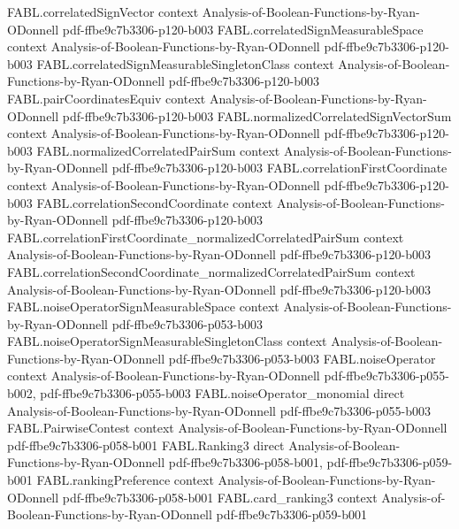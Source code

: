 \begin{theorem}
\proofstep
  {FABL.correlatedSignVector}
  {context}
  {Analysis-of-Boolean-Functions-by-Ryan-ODonnell}
  {pdf-ffbe9c7b3306-p120-b003}
\proofstep
  {FABL.correlatedSignMeasurableSpace}
  {context}
  {Analysis-of-Boolean-Functions-by-Ryan-ODonnell}
  {pdf-ffbe9c7b3306-p120-b003}
\proofstep
  {FABL.correlatedSignMeasurableSingletonClass}
  {context}
  {Analysis-of-Boolean-Functions-by-Ryan-ODonnell}
  {pdf-ffbe9c7b3306-p120-b003}
\proofstep
  {FABL.pairCoordinatesEquiv}
  {context}
  {Analysis-of-Boolean-Functions-by-Ryan-ODonnell}
  {pdf-ffbe9c7b3306-p120-b003}
\proofstep
  {FABL.normalizedCorrelatedSignVectorSum}
  {context}
  {Analysis-of-Boolean-Functions-by-Ryan-ODonnell}
  {pdf-ffbe9c7b3306-p120-b003}
\proofstep
  {FABL.normalizedCorrelatedPairSum}
  {context}
  {Analysis-of-Boolean-Functions-by-Ryan-ODonnell}
  {pdf-ffbe9c7b3306-p120-b003}
\proofstep
  {FABL.correlationFirstCoordinate}
  {context}
  {Analysis-of-Boolean-Functions-by-Ryan-ODonnell}
  {pdf-ffbe9c7b3306-p120-b003}
\proofstep
  {FABL.correlationSecondCoordinate}
  {context}
  {Analysis-of-Boolean-Functions-by-Ryan-ODonnell}
  {pdf-ffbe9c7b3306-p120-b003}
\proofstep
  {FABL.correlationFirstCoordinate_normalizedCorrelatedPairSum}
  {context}
  {Analysis-of-Boolean-Functions-by-Ryan-ODonnell}
  {pdf-ffbe9c7b3306-p120-b003}
\proofstep
  {FABL.correlationSecondCoordinate_normalizedCorrelatedPairSum}
  {context}
  {Analysis-of-Boolean-Functions-by-Ryan-ODonnell}
  {pdf-ffbe9c7b3306-p120-b003}
\proofstep
  {FABL.noiseOperatorSignMeasurableSpace}
  {context}
  {Analysis-of-Boolean-Functions-by-Ryan-ODonnell}
  {pdf-ffbe9c7b3306-p053-b003}
\proofstep
  {FABL.noiseOperatorSignMeasurableSingletonClass}
  {context}
  {Analysis-of-Boolean-Functions-by-Ryan-ODonnell}
  {pdf-ffbe9c7b3306-p053-b003}
\proofstep
  {FABL.noiseOperator}
  {context}
  {Analysis-of-Boolean-Functions-by-Ryan-ODonnell}
  {pdf-ffbe9c7b3306-p055-b002,
    pdf-ffbe9c7b3306-p055-b003}
\proofstep
  {FABL.noiseOperator_monomial}
  {direct}
  {Analysis-of-Boolean-Functions-by-Ryan-ODonnell}
  {pdf-ffbe9c7b3306-p055-b003}
\proofstep
  {FABL.PairwiseContest}
  {context}
  {Analysis-of-Boolean-Functions-by-Ryan-ODonnell}
  {pdf-ffbe9c7b3306-p058-b001}
\proofstep
  {FABL.Ranking3}
  {direct}
  {Analysis-of-Boolean-Functions-by-Ryan-ODonnell}
  {pdf-ffbe9c7b3306-p058-b001,
    pdf-ffbe9c7b3306-p059-b001}
\proofstep
  {FABL.rankingPreference}
  {context}
  {Analysis-of-Boolean-Functions-by-Ryan-ODonnell}
  {pdf-ffbe9c7b3306-p058-b001}
\proofstep
  {FABL.card_ranking3}
  {context}
  {Analysis-of-Boolean-Functions-by-Ryan-ODonnell}
  {pdf-ffbe9c7b3306-p059-b001}

\end{theorem}
